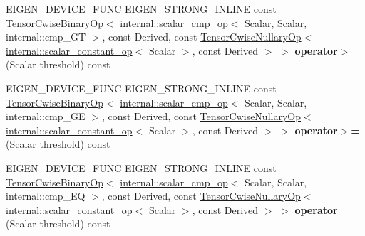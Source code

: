 \begin{DoxyCompactItemize}
E\+I\+G\+E\+N\+\_\+\+D\+E\+V\+I\+C\+E\+\_\+\+F\+U\+NC E\+I\+G\+E\+N\+\_\+\+S\+T\+R\+O\+N\+G\+\_\+\+I\+N\+L\+I\+NE const \hyperlink{class_eigen_1_1_tensor_cwise_binary_op}{Tensor\+Cwise\+Binary\+Op}$<$ \hyperlink{struct_eigen_1_1internal_1_1scalar__cmp__op}{internal\+::scalar\+\_\+cmp\+\_\+op}$<$ Scalar, Scalar, internal\+::cmp\+\_\+\+GT $>$, const Derived, const \hyperlink{class_eigen_1_1_tensor_cwise_nullary_op}{Tensor\+Cwise\+Nullary\+Op}$<$ \hyperlink{struct_eigen_1_1internal_1_1scalar__constant__op}{internal\+::scalar\+\_\+constant\+\_\+op}$<$ Scalar $>$, const Derived $>$ $>$ {\bfseries operator$>$} (Scalar threshold) const
\item 
\mbox{\label{class_eigen_1_1_tensor_base_3_01_derived_00_01_read_only_accessors_01_4_a331e9e4fccb50d83afd6f10fb8e677e2}} 
E\+I\+G\+E\+N\+\_\+\+D\+E\+V\+I\+C\+E\+\_\+\+F\+U\+NC E\+I\+G\+E\+N\+\_\+\+S\+T\+R\+O\+N\+G\+\_\+\+I\+N\+L\+I\+NE const \hyperlink{class_eigen_1_1_tensor_cwise_binary_op}{Tensor\+Cwise\+Binary\+Op}$<$ \hyperlink{struct_eigen_1_1internal_1_1scalar__cmp__op}{internal\+::scalar\+\_\+cmp\+\_\+op}$<$ Scalar, Scalar, internal\+::cmp\+\_\+\+GE $>$, const Derived, const \hyperlink{class_eigen_1_1_tensor_cwise_nullary_op}{Tensor\+Cwise\+Nullary\+Op}$<$ \hyperlink{struct_eigen_1_1internal_1_1scalar__constant__op}{internal\+::scalar\+\_\+constant\+\_\+op}$<$ Scalar $>$, const Derived $>$ $>$ {\bfseries operator$>$=} (Scalar threshold) const
\item 
\mbox{\label{class_eigen_1_1_tensor_base_3_01_derived_00_01_read_only_accessors_01_4_a018576344fd30b953a54b9a917296e57}} 
E\+I\+G\+E\+N\+\_\+\+D\+E\+V\+I\+C\+E\+\_\+\+F\+U\+NC E\+I\+G\+E\+N\+\_\+\+S\+T\+R\+O\+N\+G\+\_\+\+I\+N\+L\+I\+NE const \hyperlink{class_eigen_1_1_tensor_cwise_binary_op}{Tensor\+Cwise\+Binary\+Op}$<$ \hyperlink{struct_eigen_1_1internal_1_1scalar__cmp__op}{internal\+::scalar\+\_\+cmp\+\_\+op}$<$ Scalar, Scalar, internal\+::cmp\+\_\+\+EQ $>$, const Derived, const \hyperlink{class_eigen_1_1_tensor_cwise_nullary_op}{Tensor\+Cwise\+Nullary\+Op}$<$ \hyperlink{struct_eigen_1_1internal_1_1scalar__constant__op}{internal\+::scalar\+\_\+constant\+\_\+op}$<$ Scalar $>$, const Derived $>$ $>$ {\bfseries operator==} (Scalar threshold) const
\item 
\mbox{\label{class_eigen_1_1_tensor_base_3_01_derived_00_01_read_only_accessors_01_4_a38b6869d2f0f07176f48c5c8e1df7d5f}} 

\end{DoxyCompactItemize}
